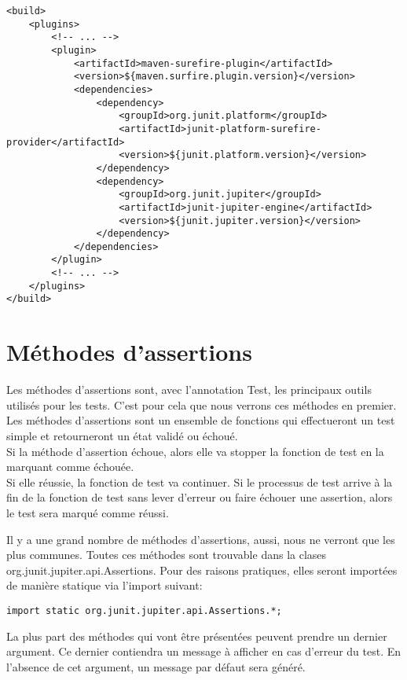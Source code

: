 \documentclass[12pt]{article}		%
\begin{document}
\lstset{language=XML, numbers=left}
\begin{lstlisting}[basicstyle=\small]
<build>
    <plugins>
    	<!-- ... -->
        <plugin>
            <artifactId>maven-surefire-plugin</artifactId>
            <version>${maven.surfire.plugin.version}</version>
            <dependencies>
                <dependency>
                    <groupId>org.junit.platform</groupId>
                    <artifactId>junit-platform-surefire-provider</artifactId>
                    <version>${junit.platform.version}</version>
                </dependency>
                <dependency>
                    <groupId>org.junit.jupiter</groupId>
                    <artifactId>junit-jupiter-engine</artifactId>
                    <version>${junit.jupiter.version}</version>
                </dependency>
            </dependencies>
        </plugin>
    	<!-- ... -->
    </plugins>
</build>
\end{lstlisting}

\section{Méthodes d'assertions}

Les méthodes d'assertions sont, avec l'annotation Test, les principaux outils utilisés pour les tests. C'est pour cela que nous verrons ces méthodes en premier. Les méthodes d'assertions sont un ensemble de fonctions qui effectueront un test simple et retourneront un état validé ou échoué. \\ Si la méthode d'assertion échoue, alors elle va stopper la fonction de test en la marquant comme échouée. \\ Si elle réussie, la fonction de test va continuer. Si le processus de test arrive à la fin de la fonction de test sans lever d'erreur ou faire échouer une assertion, alors le test sera marqué comme réussi.

Il y a une grand nombre de méthodes d'assertions, aussi, nous ne verront que les plus communes. Toutes ces méthodes sont trouvable dans la clases org.junit.jupiter.api.Assertions. Pour des raisons pratiques, elles seront importées de manière statique via l'import suivant:

\lstset{language=Java, numbers=left}
\begin{lstlisting}[basicstyle=\small]
import static org.junit.jupiter.api.Assertions.*;
\end{lstlisting}

La plus part des méthodes qui vont être présentées peuvent prendre un dernier argument. Ce dernier contiendra un message à afficher en cas d'erreur du test. En l'absence de cet argument, un message par défaut sera généré.
\end{document}
